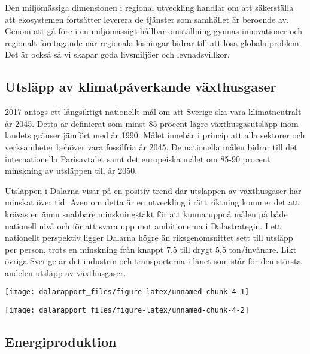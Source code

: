 \documentclass[
]{article}
\begin{document}
Den miljömässiga dimensionen i regional utveckling handlar om att
säkerställa att ekosystemen fortsätter leverera de tjänster som
samhället är beroende av. Genom att gå före i en miljömässigt hållbar
omställning gynnas innovationer och regionalt företagande när regionala
lösningar bidrar till att lösa globala problem. Det är också så vi
skapar goda livsmiljöer och levnadsvillkor.

\hypertarget{utsluxe4pp-av-klimatpuxe5verkande-vuxe4xthusgaser}{%
\subsection{Utsläpp av klimatpåverkande
växthusgaser}\label{utsluxe4pp-av-klimatpuxe5verkande-vuxe4xthusgaser}}

2017 antogs ett långsiktigt nationellt mål om att Sverige ska vara
klimatneutralt år 2045. Detta är definierat som minst 85 procent lägre
växthusgasutsläpp inom landets gränser jämfört med år 1990. Målet
innebär i princip att alla sektorer och verksamheter behöver vara
fossilfria år 2045. De nationella målen bidrar till det internationella
Parisavtalet samt det europeiska målet om 85-90 procent minskning av
utsläppen till år 2050.

Utsläppen i Dalarna visar på en positiv trend där utsläppen av
växthusgaser har minskat över tid. Även om detta är en utveckling i rätt
riktning kommer det att krävas en ännu snabbare minskningstakt för att
kunna uppnå målen på både nationell nivå och för att svara upp mot
ambitionerna i Dalastrategin. I ett nationellt perspektiv ligger Dalarna
högre än riksgenomsnittet sett till utsläpp per person, trots en
minskning från knappt 7,5 till drygt 5,5 ton/invånare. Likt övriga
Sverige är det industrin och transporterna i länet som står för den
största andelen utsläpp av växthusgaser.

\begin{center}\texttt{[image: dalarapport\_files/figure-latex/unnamed-chunk-4-1]} \end{center}

\begin{center}\texttt{[image: dalarapport\_files/figure-latex/unnamed-chunk-4-2]} \end{center}

\newpage

\hypertarget{energiproduktion}{%
\subsection{Energiproduktion}\label{energiproduktion}}
\end{document}
